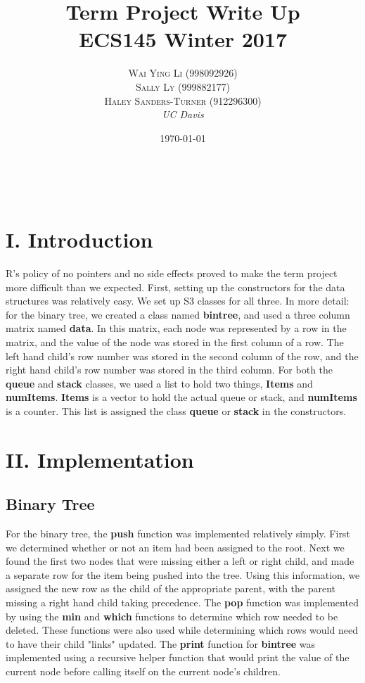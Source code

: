 \documentclass[a4paper, 11pt]{article} %
\title{\textbf{Term Project Write Up}\\ %
ECS145 Winter 2017} %
\author{\textsc{Wai Ying Li (998092926) \\ \textsc{Sally Ly (999882177)} \\ \textsc{Haley Sanders-Turner (912296300)}} %
\\{\textit{UC Davis}}} %
\date{\today} %
\makeatletter
\renewcommand{\maketitle}{ %
\begin{flushright} %
{\LARGE\@title} %

\vspace{50pt} %

{\large\@author} %
\\\@date %

\vspace{40pt} %
\end{flushright}
}
\makeatother
\begin{document}
\maketitle %


\section*{I. Introduction}

\hspace{4ex} R's policy of no pointers and no side effects proved to make the term project more difficult than we expected. First, setting up the constructors for the data structures was relatively easy. We set up S3 classes for all three. In more detail: for the binary tree, we created a class named \textbf{bintree}, and used a three column matrix named \textbf{data}. In this matrix, each node was represented by a row in the matrix, and the value of the node was stored in the first column of a row. The left hand child's row number was stored in the second column of the row, and the right hand child's row number was stored in the third column. For both the \textbf{queue} and \textbf{stack} classes, we used a list to hold two things, \textbf{Items} and \textbf{numItems}. \textbf{Items} is a vector to hold the actual queue or stack, and \textbf{numItems} is a counter. This list is assigned the class \textbf{queue} or \textbf{stack} in the constructors.



\section*{II. Implementation}

\subsection*{Binary Tree}
\hspace{4ex} For the binary tree, the \textbf{push} function was implemented relatively simply. First we determined whether or not an item had been assigned to the root. Next we found the first two nodes that were missing either a left or right child, and made a separate row for the item being pushed into the tree. Using this information, we assigned the new row as the child of the appropriate parent, with the parent missing a right hand child taking precedence. The \textbf{pop} function was implemented by using the \textbf{min} and \textbf{which} functions to determine which row needed to be deleted. These functions were also used while determining which rows would need to have their child "links" updated. The \textbf{print} function for \textbf{bintree} was implemented using a recursive helper function that would print the value of the current node before calling itself on the current node's children.
\end{document}
